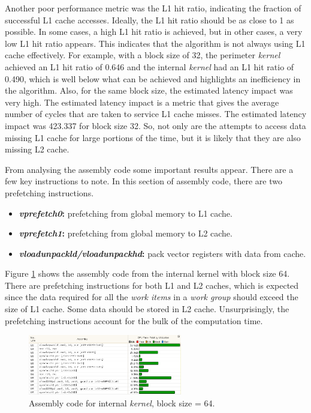 \par{Another poor performance metric was the L1 hit ratio, indicating the 
    fraction of successful L1 cache accesses. Ideally, the L1 hit ratio 
    should be as close to 1 as possible. In some cases, a high L1 hit 
    ratio is achieved, but in other cases, a very low L1 hit 
    ratio appears. This indicates that the algorithm is not always 
    using L1 cache effectively. For example, with a block size of 32, 
    the perimeter \emph{kernel} achieved an L1 hit ratio of 0.646 and the 
    internal \emph{kernel} had an L1 hit ratio of 0.490, which is well 
    below what can be achieved and highlights an inefficiency in 
    the algorithm. Also, for the same block size, the estimated latency 
    impact was very high. The estimated latency impact is a metric that 
    gives the average number of cycles that are taken to service L1 
    cache misses. The estimated latency impact was 423.337 for block 
    size 32. So, not only are the attempts to access data missing L1 
    cache for large portions of the time, but it is likely that they 
    are also missing L2 cache.}

\par{From analysing the assembly code some important results appear. 
    There are a few key instructions to note. In this section of 
    assembly code, there are two prefetching instructions.}

\begin{itemize}
    \item \textbf{\emph{vprefetch0}:} prefetching from global memory to L1 cache.
    \item \textbf{\emph{vprefetch1}:} prefetching from global memory to L2 cache.
    \item \textbf{\emph{vloadunpackld/vloadunpackhd}:} pack vector registers 
        with data from cache.
\end{itemize}

\par{Figure \ref{Assembly_64} shows the assembly code from the internal 
    kernel with block size 64. There are prefetching instructions 
    for both L1 and L2 caches, which is expected since the data required 
    for all the \emph{work items} in a \emph{work group} should exceed the size of 
    L1 cache. Some data should be stored in L2 cache. Unsurprisingly, 
    the prefetching instructions account for the 
    bulk of the computation time.}

\begin{figure}[!h]
    \centering
    \includegraphics[width=0.6\textwidth]{figures/Assembly_64.png}
    \caption{Assembly code for internal \emph{kernel}, block size = 64.}
    \label{Assembly_64}
\end{figure}

